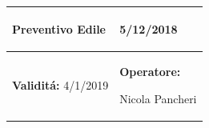 \documentclass[a4paper]{article}
\begin{document}
                          \begin{center}
                          \begin{tabular}{|L{89mm} R{60mm}| }
                          \hline
                          \vspace{2.5mm}
                          \begin{spacing}{0}
                            \textbf{Preventivo Edile}
                          \end{spacing}&
                          \vspace{2.5mm}
                          \begin{spacing}{0}

                     5/12/2018

                          \end{spacing}\\
                          \hline
                          \vspace{2.5mm}
                          \begin{spacing}{0}
                            \textbf{Validit\'a:}
                       4/1/2019
                          \end{spacing} &
                          \vspace{2.5mm}
                          \begin{spacing}{0}
                            \textbf{Operatore:}

                       Nicola Pancheri
                          \end{spacing} \\
                          \hline
                          \end{tabular}
                          \end{center}
\end{document}
